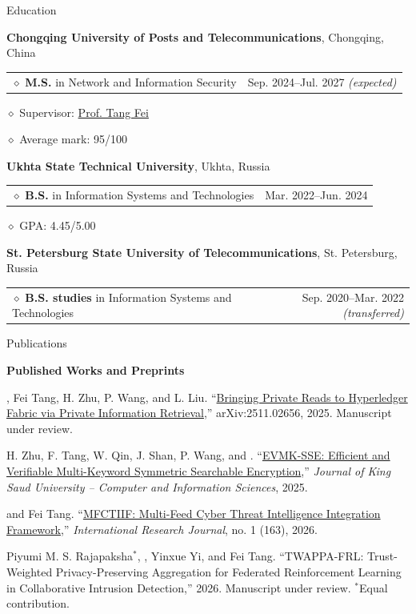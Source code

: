 \documentclass[11pt,a4paper]{article}
\makeatletter
\newcommand{\cvrow}[2]{%
  \noindent
  \begin{minipage}[t]{0.145\textwidth}
    \vspace{0pt}%
    \raggedright
    \fontsize{10.5}{12.5}\selectfont
    #1
  \end{minipage}%
  \hfill
  \begin{minipage}[t]{0.835\textwidth}
    \vspace{0pt}%
    #2
  \end{minipage}\par
}
\newcommand{\pub}[2]{%
  #1 #2\par
  \vspace{0.28em}
}
\newcommand{\eduentry}[2]{%
  \noindent
  \begin{tabularx}{\linewidth}
    {@{}X@{\hspace{0.8em}}r@{}}
    #1 & \small #2
  \end{tabularx}\par
  \vspace{0.15em}
}
\newcommand{\edudetail}[1]{%
  \noindent\hspace*{1.15em}$\diamond$ #1\par
}
\makeatother
\begin{document}
\cvrow{Education}{%
  \raggedright

  \textbf{Chongqing University of Posts and Telecommunications},
  Chongqing, China\par
  \vspace{0.12em}

  \eduentry
    {$\diamond$ \textbf{M.S.} in Network and Information Security}
    {Sep. 2024--Jul. 2027 \textit{(expected)}}

  \edudetail{Supervisor:
    \href{https://faculty.cqupt.edu.cn/tangfei/en/index.htm}{Prof. Tang Fei}}
  \edudetail{Average mark: 95/100}

  \vspace{0.48em}

  \textbf{Ukhta State Technical University},
  Ukhta, Russia\par
  \vspace{0.12em}

  \eduentry
    {$\diamond$ \textbf{B.S.} in Information Systems and Technologies}
    {Mar. 2022--Jun. 2024}

  \edudetail{GPA: 4.45/5.00}

  \vspace{0.48em}

  \textbf{St. Petersburg State University of Telecommunications},
  St. Petersburg, Russia\par
  \vspace{0.12em}

  \eduentry
    {$\diamond$ \textbf{B.S. studies} in Information Systems and Technologies}
    {Sep. 2020--Mar. 2022 \textit{(transferred)}}
}

\vspace{0.75em}

\cvrow{Publications}{%
  \textbf{Published Works and Preprints}\par\vspace{0.25em}

  \pub{\underbar{Artur Iasenovets}, Fei Tang, H. Zhu, P. Wang, and L. Liu.}
  {``\href{https://arxiv.org/abs/2511.02656}
  {Bringing Private Reads to Hyperledger Fabric via Private Information Retrieval},''
  arXiv:2511.02656, 2025. Manuscript under review.}

  \pub{H. Zhu, F. Tang, W. Qin, J. Shan, P. Wang, and \underbar{Artur Iasenovets}.}
  {``\href{https://doi.org/10.1007/s44443-025-00405-8}
  {EVMK-SSE: Efficient and Verifiable Multi-Keyword Symmetric Searchable Encryption},''
  \textit{Journal of King Saud University -- Computer and Information Sciences}, 2025.}

  \pub{\underbar{Artur Iasenovets} and Fei Tang.}
  {``\href{https://doi.org/10.60797/IRJ.2026.163.57}
  {MFCTIIF: Multi-Feed Cyber Threat Intelligence Integration Framework},''
  \textit{International Research Journal}, no. 1 (163), 2026.}

  \pub{Piyumi M. S. Rajapaksha$^{*}$, \underbar{Artur Iasenovets$^{*}$},
  Yinxue Yi, and Fei Tang.}
  {``TWAPPA-FRL: Trust-Weighted Privacy-Preserving Aggregation for Federated
  Reinforcement Learning in Collaborative Intrusion Detection,''
  2026. Manuscript under review. $^{*}$Equal contribution.}
}
\end{document}
